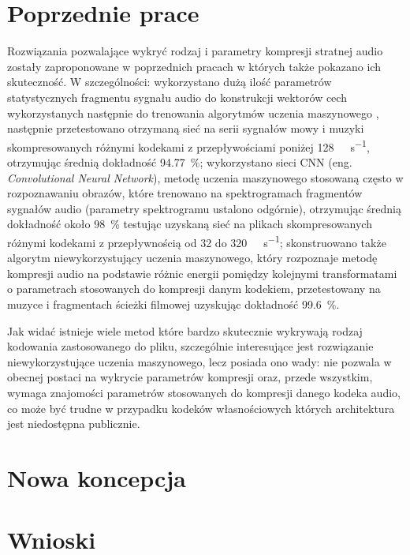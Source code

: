 \documentclass[12pt]{oska}
\let\Oldsection\section
\renewcommand{\section}{\FloatBarrier\Oldsection}
\begin{document}
\section{Poprzednie prace}
Rozwiązania pozwalające wykryć rodzaj i parametry kompresji stratnej audio
zostały zaproponowane w poprzednich pracach w których także pokazano
ich skuteczność. W szczególności: wykorzystano dużą ilość parametrów
statystycznych fragmentu sygnału audio do konstrukcji wektorów cech
wykorzystanych następnie do trenowania algorytmów uczenia maszynowego%
\cite{Hicsonmez2011AudioCI}, następnie przetestowano otrzymaną sieć na serii
sygnałów mowy i muzyki skompresowanych różnymi kodekami z przepływościami poniżej
\SI{128}{\kilo\bit\per\second}, otrzymując średnią dokładność
\SI{94.77}{\percent}\cite{Hicsonmez2013MethodsIT}; wykorzystano sieci CNN (eng.
\textit{Convolutional Neural Network}), metodę uczenia maszynowego stosowaną
często w rozpoznawaniu obrazów, które trenowano na spektrogramach fragmentów
sygnałów audio (parametry spektrogramu ustalono odgórnie), otrzymując średnią
dokładność około \SI{98}{\percent} testując uzyskaną sieć na plikach
skompresowanych różnymi kodekami z przepływnością od \num{32} do
\SI{320}{\kilo\bit\per\second}\cite{Hennequin2017CodecIL}; skonstruowano także
algorytm niewykorzystujący uczenia maszynowego, który rozpoznaje metodę
kompresji audio na podstawie różnic energii pomiędzy kolejnymi transformatami o
parametrach stosowanych do kompresji danym kodekiem, przetestowany na muzyce i
fragmentach ścieżki filmowej uzyskując dokładność
\SI{99.6}{\percent}\cite{Kim2018LossyAC}.

Jak widać istnieje wiele metod które bardzo skutecznie wykrywają rodzaj
kodowania zastosowanego do pliku, szczególnie interesujące jest rozwiązanie
niewykorzystujące uczenia maszynowego, lecz posiada ono wady: nie pozwala w
obecnej postaci na wykrycie parametrów kompresji oraz, przede wszystkim, wymaga
znajomości parametrów stosowanych do kompresji danego kodeka audio, co może być
trudne w przypadku kodeków własnościowych których architektura jest niedostępna
publicznie.
\section{Nowa koncepcja}
\section{Wnioski}

\printbibliography
\end{document}
